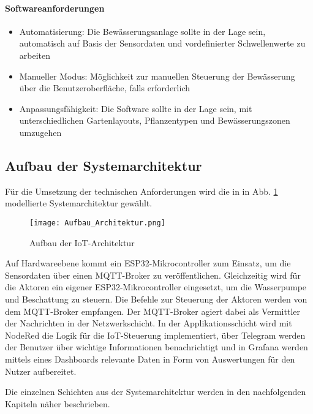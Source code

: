 \paragraph{Softwareanforderungen}
\begin{itemize}
\item Automatisierung: Die Bewässerungsanlage sollte in der Lage sein, automatisch auf Basis der Sensordaten und vordefinierter Schwellenwerte zu arbeiten
\item Manueller Modus: Möglichkeit zur manuellen Steuerung der Bewässerung über die Benutzeroberfläche, falls erforderlich
\item Anpassungsfähigkeit: Die Software sollte in der Lage sein, mit unterschiedlichen Gartenlayouts, Pflanzentypen und Bewässerungszonen umzugehen
\end{itemize}


\subsection{Aufbau der Systemarchitektur}

Für die Umsetzung der technischen Anforderungen wird die in in Abb. \ref{fig:iotschichten} modellierte Systemarchitektur gewählt. 

\begin{figure}[h]
  \centering
  \texttt{[image: Aufbau\_Architektur.png]}
  \caption{Aufbau der IoT-Architektur}\label{fig:iotschichten}
\end{figure}

Auf Hardwareebene kommt ein ESP32-Mikrocontroller zum Einsatz, um die Sensordaten über einen MQTT-Broker zu veröffentlichen. Gleichzeitig wird für die Aktoren ein eigener ESP32-Mikrocontroller eingesetzt, um die Wasserpumpe und Beschattung zu steuern. Die Befehle zur Steuerung der Aktoren werden von dem MQTT-Broker empfangen. Der MQTT-Broker agiert dabei als Vermittler der Nachrichten in der Netzwerkschicht. In der Applikationsschicht wird mit NodeRed die Logik für die IoT-Steuerung implementiert, über Telegram werden der Benutzer über wichtige Informationen benachrichtigt und in Grafana werden mittels eines Dashboards relevante Daten in Form von Auswertungen für den Nutzer aufbereitet.

Die einzelnen Schichten aus der Systemarchitektur werden in den nachfolgenden Kapiteln näher beschrieben.